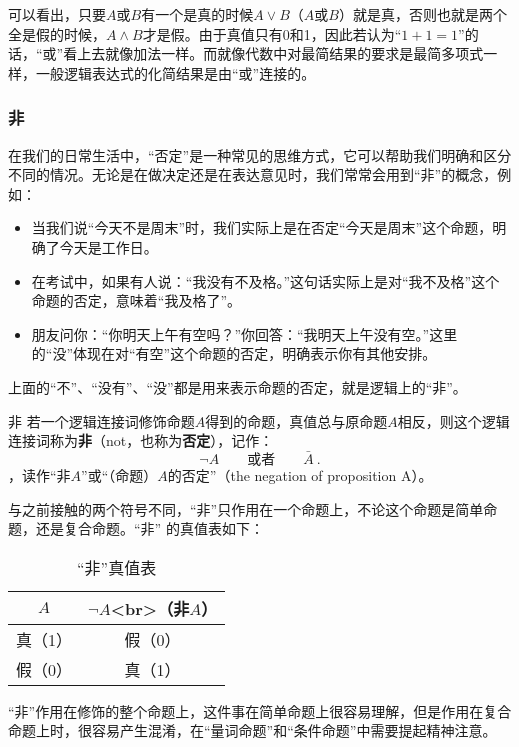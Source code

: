 可以看出，只要$A$或$B$有一个是真的时候$A\lor B$（$A$或$B$）就是真，否则也就是两个全是假的时候，$A\land B$才是假。由于真值只有0和1，因此若认为“$1+1=1$”的话，“或”看上去就像加法一样。而就像代数中对最简结果的要求是最简多项式一样，一般逻辑表达式的化简结果是由“或”连接的。

\subsubsection{非}

在我们的日常生活中，“否定”是一种常见的思维方式，它可以帮助我们明确和区分不同的情况。无论是在做决定还是在表达意见时，我们常常会用到“非”的概念，例如：
\begin{itemize}
\item 当我们说“今天不是周末”时，我们实际上是在否定“今天是周末”这个命题，明确了今天是工作日。
\item 在考试中，如果有人说：“我没有不及格。”这句话实际上是对“我不及格”这个命题的否定，意味着“我及格了”。
\item 朋友问你：“你明天上午有空吗？”你回答：“我明天上午没有空。”这里的“没”体现在对“有空”这个命题的否定，明确表示你有其他安排。
\end{itemize}

上面的“不”、“没有”、“没”都是用来表示命题的否定，就是逻辑上的“非”。

\begin{definition}{非}
若一个逻辑连接词修饰命题$A$得到的命题，真值总与原命题$A$相反，则这个逻辑连接词称为\textbf{非}（not，也称为\textbf{否定}），记作：
\begin{equation}
\lnot A\qquad\text{或者}\qquad\bar{A}~.
\end{equation}
，读作“非$A$”或“（命题）$A$的否定”（the negation of proposition A）。
\end{definition}

与之前接触的两个符号不同，“非”只作用在一个命题上，不论这个命题是简单命题，还是复合命题。“非” 的真值表如下：

\begin{table}[ht]
\centering
\caption{“非”真值表}\label{tab_HsCoPr3}
\begin{tabular}{|c|c|}
\hline
$A$ & $\lnot A$<br>（非$A$） \\
\hline
真（1） & 假（0） \\
\hline
假（0） & 真（1） \\
\hline
\end{tabular}
\end{table}

“非”作用在修饰的整个命题上，这件事在简单命题上很容易理解，但是作用在复合命题上时，很容易产生混淆，在“量词命题”和“条件命题”中需要提起精神注意。


